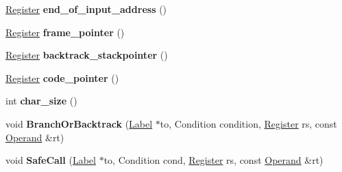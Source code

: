\begin{DoxyCompactItemize}
\item 
\hyperlink{structv8_1_1internal_1_1_register}{Register} {\bfseries end\+\_\+of\+\_\+input\+\_\+address} ()\hypertarget{classv8_1_1internal_1_1_reg_exp_macro_assembler_m_i_p_s_a0b9971305554ba14a17d1c721b7c3a7c}{}\label{classv8_1_1internal_1_1_reg_exp_macro_assembler_m_i_p_s_a0b9971305554ba14a17d1c721b7c3a7c}

\item 
\hyperlink{structv8_1_1internal_1_1_register}{Register} {\bfseries frame\+\_\+pointer} ()\hypertarget{classv8_1_1internal_1_1_reg_exp_macro_assembler_m_i_p_s_af6e1f89805a697bd0f97f494c421c864}{}\label{classv8_1_1internal_1_1_reg_exp_macro_assembler_m_i_p_s_af6e1f89805a697bd0f97f494c421c864}

\item 
\hyperlink{structv8_1_1internal_1_1_register}{Register} {\bfseries backtrack\+\_\+stackpointer} ()\hypertarget{classv8_1_1internal_1_1_reg_exp_macro_assembler_m_i_p_s_ab141a2277a4984a51d709d65cdb9910a}{}\label{classv8_1_1internal_1_1_reg_exp_macro_assembler_m_i_p_s_ab141a2277a4984a51d709d65cdb9910a}

\item 
\hyperlink{structv8_1_1internal_1_1_register}{Register} {\bfseries code\+\_\+pointer} ()\hypertarget{classv8_1_1internal_1_1_reg_exp_macro_assembler_m_i_p_s_abc9969c6821755a52c50dad37f3ee5d2}{}\label{classv8_1_1internal_1_1_reg_exp_macro_assembler_m_i_p_s_abc9969c6821755a52c50dad37f3ee5d2}

\item 
int {\bfseries char\+\_\+size} ()\hypertarget{classv8_1_1internal_1_1_reg_exp_macro_assembler_m_i_p_s_a90e3aab1b3877a8663409ebb253f1050}{}\label{classv8_1_1internal_1_1_reg_exp_macro_assembler_m_i_p_s_a90e3aab1b3877a8663409ebb253f1050}

\item 
void {\bfseries Branch\+Or\+Backtrack} (\hyperlink{classv8_1_1internal_1_1_label}{Label} $\ast$to, Condition condition, \hyperlink{structv8_1_1internal_1_1_register}{Register} rs, const \hyperlink{classv8_1_1internal_1_1_operand}{Operand} \&rt)\hypertarget{classv8_1_1internal_1_1_reg_exp_macro_assembler_m_i_p_s_a0a61cccf21e0a2a6b52e418b27eb1153}{}\label{classv8_1_1internal_1_1_reg_exp_macro_assembler_m_i_p_s_a0a61cccf21e0a2a6b52e418b27eb1153}

\item 
void {\bfseries Safe\+Call} (\hyperlink{classv8_1_1internal_1_1_label}{Label} $\ast$to, Condition cond, \hyperlink{structv8_1_1internal_1_1_register}{Register} rs, const \hyperlink{classv8_1_1internal_1_1_operand}{Operand} \&rt)\hypertarget{classv8_1_1internal_1_1_reg_exp_macro_assembler_m_i_p_s_a33f184465610b071f3cb1169eab36ce6}{}\label{classv8_1_1internal_1_1_reg_exp_macro_assembler_m_i_p_s_a33f184465610b071f3cb1169eab36ce6}


\end{DoxyCompactItemize}
